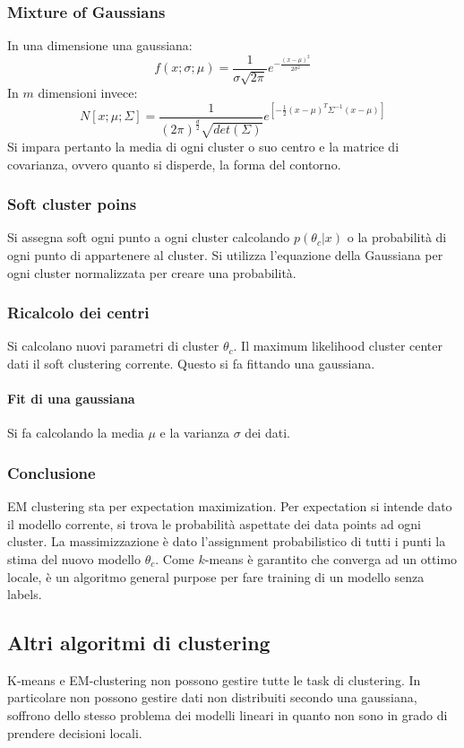 		\subsubsection{Mixture of Gaussians}
		In una dimensione una gaussiana:
		$$f(x;\sigma;\mu) = \frac{1}{\sigma\sqrt{2\pi}}e^{-\frac{(x-\mu)^2}{2\sigma^2}}$$
		In $m$ dimensioni invece:
		$$N[x;\mu;\Sigma] = \frac{1}{(2\pi)^{\frac{d}{2}}\sqrt{det(\Sigma)}}e^{[-\frac{1}{2}(x-\mu)^T\Sigma^{-1}(x-\mu)]}$$
		Si impara pertanto la media di ogni cluster o suo centro e la matrice di covarianza, ovvero quanto si disperde, la forma del contorno.

		\subsubsection{Soft cluster poins}
		Si assegna soft ogni punto a ogni cluster calcolando $p(\theta_c|x)$ o la probabilit\`a di ogni punto di appartenere al cluster.
		Si utilizza l'equazione della Gaussiana per ogni cluster normalizzata per creare una probabilit\`a.

		\subsubsection{Ricalcolo dei centri}
		Si calcolano nuovi parametri di cluster $\theta_c$.
		Il maximum likelihood cluster center dati il soft clustering corrente.
		Questo si fa fittando una gaussiana.

			\paragraph{Fit di una gaussiana}
			Si fa calcolando la media $\mu$ e la varianza $\sigma$ dei dati.

		\subsubsection{Conclusione}
		EM clustering sta per expectation maximization.
		Per expectation si intende dato il modello corrente, si trova le probabilit\`a aspettate dei data points ad ogni cluster.
		La massimizzazione \`e dato l'assignment probabilistico di tutti i punti la stima del nuovo modello $\theta_c$.
		Come $k$-means \`e garantito che converga ad un ottimo locale, \`e un algoritmo general purpose per fare training di un modello senza labels.

	\subsection{Altri algoritmi di clustering}
	K-means e EM-clustering non possono gestire tutte le task di clustering.
	In particolare non possono gestire dati non distribuiti secondo una gaussiana, soffrono dello stesso problema dei modelli lineari in quanto non sono in grado di prendere decisioni locali.

